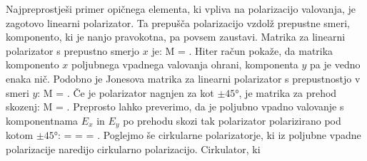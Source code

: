 Najpreprostješi
primer opičnega elementa, ki vpliva na polarizacijo valovanja,
je zagotovo linearni polarizator. Ta prepušča
polarizacijo vzdolž prepustne smeri, komponento, ki
je nanjo pravokotna, pa povsem zaustavi. Matrika za
linearni polarizator s prepustno smerjo $x$ je:
\beq
M = \left[\begin{array}{cc}
1 & 0 \\
0 & 0\\
\end{array}\right]\!\!.
\label{eq:03_481}
\eeq
Hiter račun pokaže, da matrika komponento $x$ poljubnega 
vpadnega valovanja ohrani, komponenta $y$ pa je vedno enaka nič. 
Podobno je Jonesova matrika za linearni polarizator s prepustnostjo
v smeri $y$:
\beq
M = \left[\begin{array}{cc}
0 & 0 \\
0 & 1\\
\end{array}\right]\!\!.
\label{eq:03_49}
\eeq
Če je polarizator nagnjen za kot $\pm45\si{\degree}$, je matrika
za prehod skozenj:
\beq
M = \left[\begin{array}{cc}
1 & \pm 1 \\
\pm 1 & 1\\
\end{array}\right]\!\!.
\label{eq:03_50}
\eeq
Preprosto lahko preverimo, da je poljubno vpadno valovanje s komponentnama
$E_x$ in $E_y$ po prehodu skozi tak polarizator polarizirano 
pod kotom $\pm45\si{\degree}$:
\beq
{} = \left[\begin{array}{cc}
1 & \pm 1 \\
\pm 1 & 1\\
\end{array}\right]\cdot 
\left[\begin{array}{c}
J_{1x}\\
J_{1y}\\
\end{array}\right]\!\! = 
\left[\begin{array}{c}
J_{1x} \pm J_{1y}\\
\pm J_{1x} + J_{1y}\\
\end{array}\right]\!\!=
\left[\begin{array}{c}
1\\
\pm 1\\
\end{array}\right]\!\!.
\label{eq:03_51}
\eeq
Poglejmo še cirkularne polarizatorje, ki iz poljubne
vpadne polarizacije naredijo cirkularno polarizacijo. Cirkulator, ki
